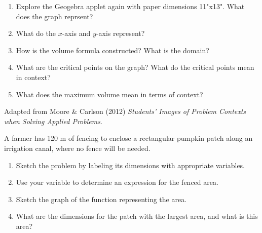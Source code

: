 \documentclass{ximera}
\begin{document}
\begin{exercise}
\begin{enumerate}
\begin{tabular}{l|l}
        \end{tabular}
        \item Explore the Geogebra applet again with paper dimensions 11"x13".  What does the graph reprsent?
        \item What do the $x$-axis and $y$-axis represent? 
        \item How is the volume formula constructed?  What is the domain?
        \item What are the critical points on the graph? What do the critical points mean in context?
        \item What does the maximum volume mean in terms of context?
    \end{enumerate}
    Adapted from Moore \& Carlson (2012) \textit{Students' Images of Problem Contexts when Solving Applied Problems}.
\end{exercise}

\begin{exercise}
    A farmer has 120 m of fencing to enclose a rectangular pumpkin patch along an irrigation canal, where no fence will be needed.
    \begin{enumerate}
        \item Sketch the problem by labeling its dimensions with appropriate variables.
        \item Use your variable to determine an expression for the fenced area.
        \item Sketch the graph of the function representing the area.
        \item What are the dimensions for the patch with the largest area, and what is this area?
    \end{enumerate}
\end{exercise}
\end{document}

